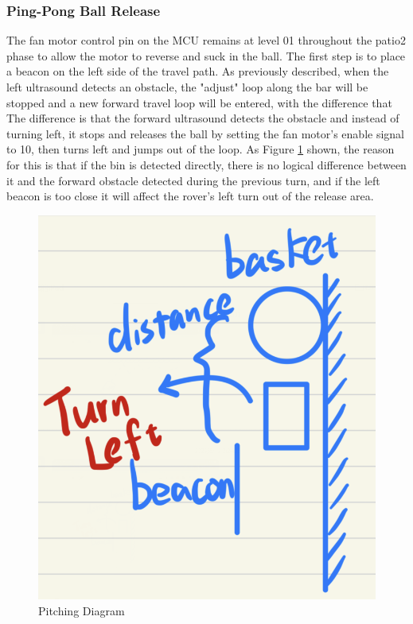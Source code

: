 \documentclass[12pt, a4paper, oneside]{report}
\begin{document}
\subsubsection{Ping-Pong Ball Release}
The fan motor control pin on the MCU remains at level 01 throughout the patio2 phase to allow the motor to reverse and suck in the ball. The first step is to place a beacon on the left side of the travel path. As previously described, when the left ultrasound detects an obstacle, the "adjust" loop along the bar will be stopped and a new forward travel loop will be entered, with the difference that The difference is that the forward ultrasound detects the obstacle and instead of turning left, it stops and releases the ball by setting the fan motor's enable signal to 10, then turns left and jumps out of the loop. As Figure \ref{pitch} shown, the reason for this is that if the bin is detected directly, there is no logical difference between it and the forward obstacle detected during the previous turn, and if the left beacon is too close it will affect the rover's left turn out of the release area.

\begin{figure}[H]
    \centering
    \includegraphics[scale=0.2]{pic/Patio 2/Fig10.png}
    \caption{Pitching Diagram}
    \label{pitch}
\end{figure}
\end{document}
